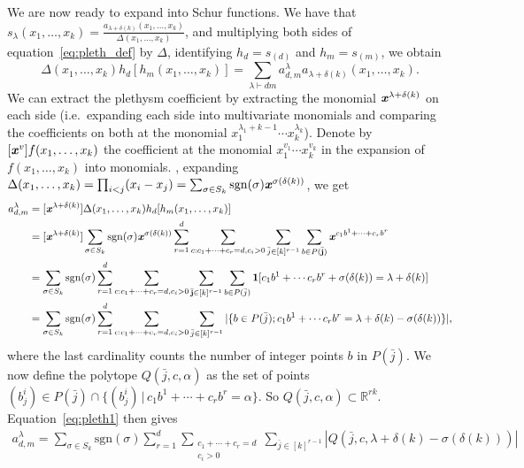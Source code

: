 \documentclass[11pt]{amsart}
\theoremstyle{plain}
\theoremstyle{definition}
\numberwithin{equation}{section}
\def\bx{{\textbf{\textit{x}}}}
\newcommand{\la}{\lambda}
\def\sgn{\mathrm{sgn}}
\def\bbj{{\text{\bf j}}}
\def\sgn{\mathrm{sgn}}
\def\la{\lambda}
\begin{document}
We are now ready to expand into Schur functions. We have that $s_\la(x_1,\ldots,x_k) = \frac{ a_{\la+\delta(k)}(x_1,\ldots,x_k) }{\Delta(x_1,\ldots,x_k)}$, and  multiplying both sides of equation~\ref{eq:pleth_def} by $\Delta$, identifying $h_d=s_{(d)}$ and $h_{m}=s_{(m)}$, we obtain 
$$\Delta(x_1,\ldots,x_k) h_d[h_m(x_1,\ldots,x_k)] = \sum_{\la \vdash dm} a^\la_{d,m} a_{\la+\delta(k)}(x_1,\ldots,x_k).$$
We can extract the plethysm coefficient by extracting the monomial $\bx^{\la+\delta(k)}$ on each side (i.e.\ expanding each side into multivariate monomials and comparing the coefficients on both at the monomial $x_1^{\la_1+k-1}\cdots x_k^{\la_k}$). Denote by $[\bx^v]f(x_1,\ldots,x_k)$ the coefficient at the monomial $x_1^{v_1}\cdots x_k^{v_k}$ in the expansion of $f(x_1,\ldots,x_k)$ into monomials. , expanding $\Delta(x_1,\ldots,x_k) = \prod_{i<j}(x_i-x_j) = \sum_{\sigma \in S_k} \sgn(\sigma) \bx^{\sigma(\delta(k))}$, we get
\begin{align}\label{eq:pleth1}
a^\la_{d,m} &= [\bx^{\la+\delta(k)}] \Delta(x_1,\ldots,x_k) h_d[h_m(x_1,\ldots,x_k)] \notag \\
&= [\bx^{\la +\delta(k)}] \sum_{\sigma \in S_k} \sgn(\sigma) \bx^{\sigma(\delta(k))}  \sum_{r=1}^d \sum_{c: c_1+\cdots+c_r=d, c_i>0} \sum_{\bar{j} \in [k]^{r-1}} \sum_{b \in P(\bar{\bbj})}   \bx^{c_1b^1+\cdots+c_rb^r} \notag \\
&= \notag \sum_{\sigma \in S_k} \sgn(\sigma)  \sum_{r=1}^d \sum_{c: c_1+\cdots+c_r=d, c_i>0} \sum_{\bar{\bbj} \in [k]^{r-1}} \sum_{b \in P(\bar{j})}   \mathbf{1}[ c_1b^1+\cdots c_rb^r +\sigma(\delta(k)) = \la +\delta(k)] \\
&= \sum_{\sigma \in S_k} \sgn(\sigma)  \sum_{r=1}^d \sum_{c: c_1+\cdots+c_r=d, c_i>0}  \sum_{\bar{j} \in [k]^{r-1}}  |\{ b \in P(\bar{j}); c_1b^1+\cdots c_rb^r = \la +\delta(k) -\sigma(\delta(k)) \}|,
\end{align}
 where the last cardinality counts the number of integer points $b$ in $P(\bar{j})$.
We now define the polytope $Q(\bar{j}, c, \alpha)$ as the set of points $(b^i_j) \in P(\bar{j}) \cap \{ (b^i_j) \, | \, c_1b^1+\cdots +c_rb^r = \alpha\}$. So $Q(\bar{j},c,\alpha) \subset \mathbb{R}^{rk}$. Equation~\eqref{eq:pleth1} then gives
\begin{align}\label{eq:pleth_formula}
a^\la_{d,m} = \sum_{\sigma \in S_k} \sgn(\sigma) \sum_{r=1}^d \sum_{\substack{ c_1+\cdots+c_r=d\\ c_i>0}} \sum_{\bar{j} \in [k]^{r-1}} |Q(\bar{j},c,\la+\delta(k)-\sigma(\delta(k)))|
\end{align}
\end{document}
